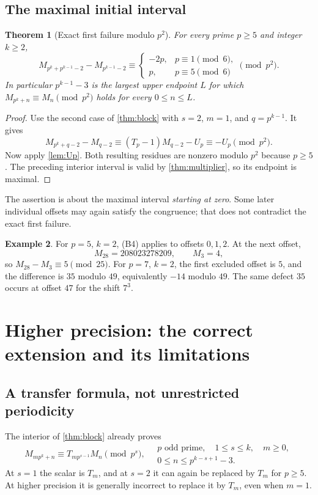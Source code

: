 \documentclass[11pt,a4paper]{article}
\numberwithin{equation}{section}
\newtheorem{theorem}{Theorem}[section]
\theoremstyle{definition}
\newtheorem{example}[theorem]{Example}
\theoremstyle{remark}
\begin{document}
\subsection{The maximal initial interval}
\begin{theorem}[Exact first failure modulo $p^2$]\label{thm:sharpP2}
For every prime $p\geq5$ and integer $k\geq2$,
\begin{equation}\label{eq:sharpP2}
 \boxed{\quad
 M_{p^k+p^{k-1}-2}-M_{p^{k-1}-2}
 \equiv
 \begin{cases}
 -2p,&p\equiv1\pmod6,\\
 p,&p\equiv5\pmod6
 \end{cases}
 \pmod{p^2}.\quad}
\end{equation}
In particular $p^{k-1}-3$ is the largest upper endpoint $L$ for which
$M_{p^k+n}\equiv M_n\pmod{p^2}$ holds for every $0\leq n\leq L$.
\end{theorem}
\begin{proof}
Use the second case of \cref{thm:block} with $s=2$, $m=1$, and
$q=p^{k-1}$. It gives
\[
 M_{p^k+q-2}-M_{q-2}
 \equiv(T_p-1)M_{q-2}-U_p\equiv-U_p\pmod{p^2}.
\]
Now apply \cref{lem:Up}. Both resulting residues are nonzero modulo
$p^2$ because $p\geq5$. The preceding interior interval is valid by
\cref{thm:multiplier}, so its endpoint is maximal.
\end{proof}

The assertion is about the maximal interval \emph{starting at zero}.
Some later individual offsets may again satisfy the congruence; that does
not contradict the exact first failure.

\begin{example}
For $p=5$, $k=2$, (B4) applies to offsets $0,1,2$. At the next offset,
\[
 M_{28}=208023278209,\qquad M_3=4,
\]
so $M_{28}-M_3\equiv5\pmod{25}$. For $p=7$, $k=2$, the first
excluded offset is $5$, and the difference is $35$ modulo $49$, equivalently $-14$ modulo $49$.
The same defect $35$ occurs at offset $47$ for the shift $7^3$.
\end{example}

\section{Higher precision: the correct extension and its limitations}\label{sec:higher}

\subsection{A transfer formula, not unrestricted periodicity}
The interior of \cref{thm:block} already proves
\begin{equation}\label{eq:precision}
 M_{mp^k+n}\equiv T_{mp^{s-1}}M_n\pmod{p^s},
 \quad
 \begin{gathered}
 p\text{ odd prime},\quad 1\leq s\leq k,\quad m\geq0,\\
 0\leq n\leq p^{k-s+1}-3.
 \end{gathered}
\end{equation}
At $s=1$ the scalar is $T_m$, and at $s=2$ it can again be replaced
by $T_m$ for $p\geq5$. At higher precision it is generally incorrect
to replace it by $T_m$, even when $m=1$.
\end{document}

